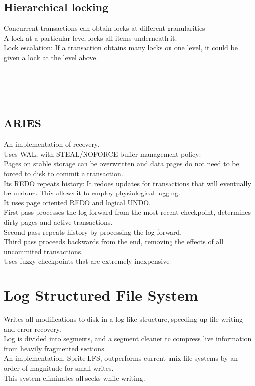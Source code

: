\subsection{Hierarchical locking}
Concurrent transactions can obtain locks at different granularities\\
A lock at a particular level locks all items underneath it.\\
Lock escalation: If a transaction obtains many locks on one level, it could be given a lock at the level above.\\
\\
\\
\\
\\
\subsection{ARIES}
An implementation of recovery. \\
Uses WAL, with STEAL/NOFORCE buffer management policy:\\
Pages on stable storage can be overwritten and data pages do not need to be forced to disk to commit a transaction. \\
Its REDO repeats history: It redoes updates for transactions that will eventually be undone. This allows it to employ physiological logging.\\
It uses page oriented REDO and logical UNDO.\\
First pass processes the log forward from the most recent checkpoint, determines dirty pages and active transactions. \\
Second pass repeats history by processing the log forward.\\
Third pass proceeds backwards from the end, removing the effects of all uncommited transactions.\\
Uses fuzzy checkpoints that are extremely inexpensive.


\section{Log Structured File System}
Writes all modifications to disk in a log-like structure, speeding up file writing and error recovery.\\
Log is divided into segments, and a segment cleaner to compress live information from heavily fragmented sections.\\
An implementation, Sprite LFS, outperforms current unix file systems by an order of magnitude for small writes.\\
This system eliminates all seeks while writing.
